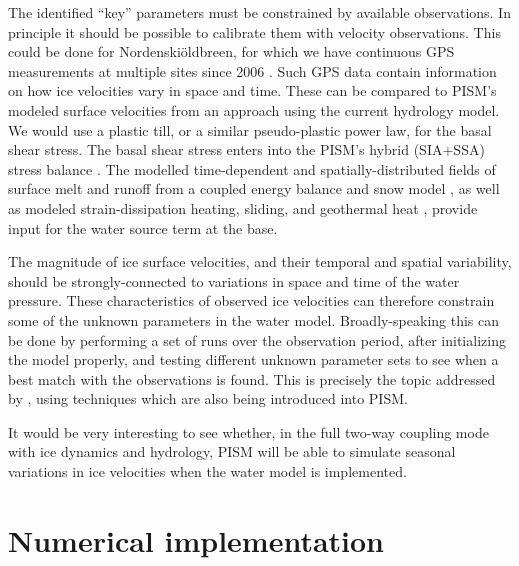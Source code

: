 \documentclass[11pt]{amsart}
\begin{document}
The identified ``key'' parameters must be constrained by available observations.  In principle it should be possible to calibrate them with velocity observations.  This could be done for Nordenski\"oldbreen, for which we have continuous GPS measurements at multiple sites since 2006 \citep{denOuden2010}.   Such GPS data contain information on how ice velocities vary in space and time.  These can be compared to PISM's modeled surface velocities from an approach using the current hydrology model.  We would use a plastic till, or a similar pseudo-plastic power law, for the basal shear stress.  The basal shear stress enters into the PISM's hybrid (SIA+SSA) stress balance \citep{BBssasliding}.  The modelled time-dependent and spatially-distributed fields of surface melt and runoff from a coupled energy balance and snow model \citep{vanPeltetal}, as well as modeled strain-dissipation heating, sliding, and geothermal heat \citep{AschwandenBuelerKhroulevBlatter}, provide input for the water source term at the base.

The magnitude of ice surface velocities, and their temporal and spatial variability, should be strongly-connected to variations in space and time of the water pressure.  These characteristics of observed ice velocities can therefore constrain some of the unknown parameters in the water model.  Broadly-speaking this can be done by performing a set of runs over the observation period, after initializing the model properly, and testing different unknown parameter sets to see when a best match with the observations is found.  This is precisely the topic addressed by \citet{Habermannetal2012}, using techniques which are also being introduced into PISM.

It would be very interesting to see whether, in the full two-way coupling mode with ice dynamics and hydrology, PISM will be able to simulate seasonal variations in ice velocities when the water model is implemented.


\section{Numerical implementation} \label{sec:implementation}
\end{document}
